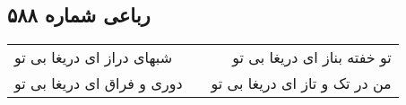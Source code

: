 \begin{center}
\section*{رباعی شماره ۵۸۸}
\label{sec:sh588}
\begin{longtable}{l p{0.5cm} r}
شبهای دراز ای دریغا بی تو
&&
تو خفته بناز ای دریغا بی تو
\\
دوری و فراق ای دریغا بی تو
&&
من در تک و تاز ای دریغا بی تو
\\
\end{longtable}
\end{center}
